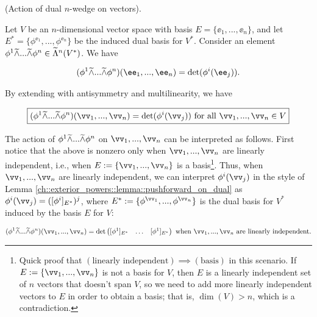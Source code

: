 \begin{theorem}
\label{ch::exterior_powers::thm::action_dual_k_wedge_on_vectors}
    (Action of dual $n$-wedge on vectors).
    
    Let $V$ be an $n$-dimensional vector space with basis $E = \{\ee_1, ..., \ee_n\}$, and let $E^* = \{\phi^{\ee_1}, ..., \phi^{\ee_n}\}$ be the induced dual basis for $V^*$. Consider an element $\phi^1 \widetilde{\wedge} ... \widetilde{\wedge} \phi^n \in \widetilde{\Lambda}^n(V^*)$. We have
    
    \begin{align*}
        (\phi^1 \twedge ... \twedge \phi^n)(\ee_1, ..., \ee_n) = \det(\phi^i(\ee_j)).
    \end{align*}
    
    By extending with antisymmetry and multilinearity, we have
    
    \begin{align*}
        \boxed
        {
            (\phi^1 \twedge ... \twedge \phi^n)(\vv_1, ..., \vv_n) = \det(\phi^i(\vv_j)) \text{ for all $\vv_1, ..., \vv_n \in V$}
        }
    \end{align*}
    
    The action of $\phi^1 \widetilde{\wedge} ... \widetilde{\wedge} \phi^n$ on $\vv_1, ..., \vv_n$ can be interpreted as follows. First notice that the above is nonzero only when $\vv_1, ..., \vv_n$ are linearly independent, i.e., when $E := \{\vv_1, ..., \vv_n\}$ is a basis\footnote{Quick proof that $(\text{linearly independent}) \implies (\text{basis})$ in this scenario. If $E := \{\vv_1, ..., \vv_n\}$ is not a basis for $V$, then $E$ is a linearly independent set of $n$ vectors that doesn't span $V$, so we need to add more linearly independent vectors to $E$ in order to obtain a basis; that is, $\dim(V) > n$, which is a contradiction.}. Thus, when $\vv_1, ..., \vv_n$ are linearly independent, we can interpret $\phi^i(\vv_j)$ in the style of Lemma \ref{ch::exterior_powers::lemma::pushforward_on_dual} as $\phi^i(\vv_j) = ([\phi^i]_{E^*})^j$, where ${E^* := \{\phi^{\vv_1}, ..., \phi^{\vv_n}\}}$ is the dual basis for $V^*$ induced by the basis $E$ for $V$:
    
    \begin{align*}
        (\phi^1 \twedge ... \twedge \phi^n)(\vv_1, ..., \vv_n) = \det \begin{pmatrix} [\phi^1]_{E^*} & \hdots & [\phi^1]_{E^*} \end{pmatrix} \text{ when $\vv_1, ..., \vv_n$ are linearly independent}.
    \end{align*}
\end{theorem}

